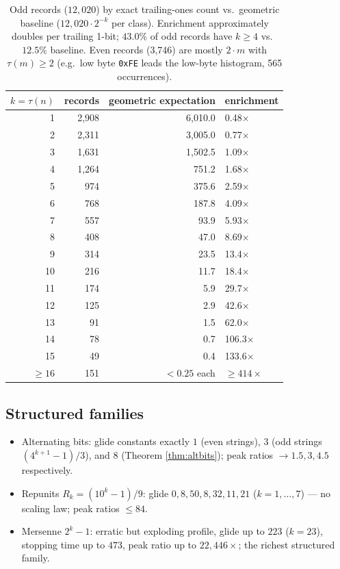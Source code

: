 \documentclass[11pt]{article}
\theoremstyle{remark}
\begin{document}
\begin{table}[t]
\centering
\small
\begin{tabular}{@{}rrrl@{}}
\toprule
$k = \tau(n)$ & records & geometric expectation & enrichment \\
\midrule
1  & 2{,}908 & 6{,}010.0 & 0.48$\times$ \\
2  & 2{,}311 & 3{,}005.0 & 0.77$\times$ \\
3  & 1{,}631 & 1{,}502.5 & 1.09$\times$ \\
4  & 1{,}264 &   751.2 & 1.68$\times$ \\
5  &   974 &   375.6 & 2.59$\times$ \\
6  &   768 &   187.8 & 4.09$\times$ \\
7  &   557 &    93.9 & 5.93$\times$ \\
8  &   408 &    47.0 & 8.69$\times$ \\
9  &   314 &    23.5 & 13.4$\times$ \\
10 &   216 &    11.7 & 18.4$\times$ \\
11 &   174 &     5.9 & 29.7$\times$ \\
12 &   125 &     2.9 & 42.6$\times$ \\
13 &    91 &     1.5 & 62.0$\times$ \\
14 &    78 &     0.7 & 106.3$\times$ \\
15 &    49 &     0.4 & 133.6$\times$ \\
$\ge 16$ & 151 & $<0.25$ each & $\ge 414\times$ \\
\bottomrule
\end{tabular}
\caption{Odd records ($12{,}020$) by exact trailing-ones count vs.\
geometric baseline ($12{,}020 \cdot 2^{-k}$ per class). Enrichment
approximately doubles per trailing 1-bit; $43.0\%$ of odd records have
$k \ge 4$ vs.\ $12.5\%$ baseline. Even records (3{,}746) are mostly
$2 \cdot m$ with $\tau(m) \ge 2$ (e.g.\ low byte \texttt{0xFE} leads the
low-byte histogram, 565 occurrences).}
\label{tab:enrich}
\end{table}

\subsection{Structured families}
\begin{itemize}
  \item Alternating bits: glide constants exactly $1$ (even strings), $3$
        (odd strings $(4^{k+1}-1)/3$), and $8$ (Theorem
        \ref{thm:altbits}); peak ratios $\to 1.5, 3, 4.5$ respectively.
  \item Repunits $R_k = (10^k - 1)/9$: glide $0, 8, 50, 8, 32, 11, 21$
        ($k = 1, \dots, 7$) --- no scaling law; peak ratios $\le 84$.
  \item Mersenne $2^k - 1$: erratic but exploding profile, glide up to
        $223$ ($k = 23$), stopping time up to $473$, peak ratio up to
        $22{,}446\times$; the richest structured family.
\end{itemize}
\end{document}
